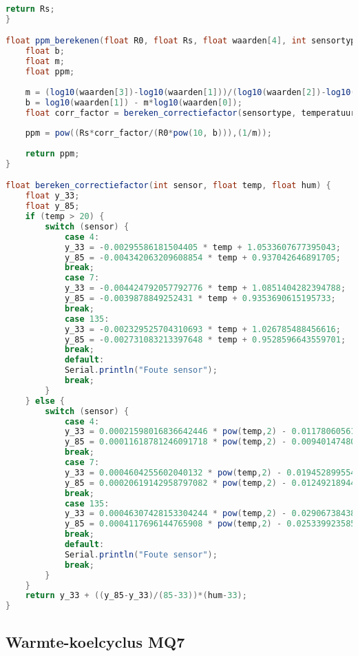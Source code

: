 \begin{lstlisting}[language=Java,caption={MQ sensoren naar de databank}]
    return Rs;
}

float ppm_berekenen(float R0, float Rs, float waarden[4], int sensortype, float temperatuur, float vochtigheid) {
    float b;
    float m;
    float ppm;
    
    m = (log10(waarden[3])-log10(waarden[1]))/(log10(waarden[2])-log10(waarden[0]));
    b = log10(waarden[1]) - m*log10(waarden[0]);
    float corr_factor = bereken_correctiefactor(sensortype, temperatuur, vochtigheid);
    
    ppm = pow((Rs*corr_factor/(R0*pow(10, b))),(1/m));
    
    return ppm;
}

float bereken_correctiefactor(int sensor, float temp, float hum) {
    float y_33;
    float y_85;
    if (temp > 20) {
        switch (sensor) {
            case 4:
            y_33 = -0.00295586181504405 * temp + 1.0533607677395043;
            y_85 = -0.004342063209608854 * temp + 0.937042646891705;
            break;
            case 7:
            y_33 = -0.004424792057792776 * temp + 1.0851404282394788;
            y_85 = -0.0039878849252431 * temp + 0.9353690615195733;
            break;
            case 135:
            y_33 = -0.002329525704310693 * temp + 1.026785488456616;
            y_85 = -0.002731083213397648 * temp + 0.9528596643559701;
            break;
            default:
            Serial.println("Foute sensor");
            break;
        }
    } else {
        switch (sensor) {
            case 4:
            y_33 = 0.00021598016836642446 * pow(temp,2) - 0.011780605617435404 * temp + 1.1489572784939854;
            y_85 = 0.00011618781246091718 * pow(temp,2) - 0.009401474805251435 * temp + 0.9921017705779126;
            break;
            case 7:
            y_33 = 0.0004604255602040132 * pow(temp,2) - 0.019452899554979888 * temp + 1.2135189729083746;
            y_85 = 0.00020619142958797082 * pow(temp,2) - 0.01249218944803551 * temp + 1.0274335776434782;
            break;
            case 135:
            y_33 = 0.00046307428153304244 * pow(temp,2) - 0.02906738438091286 * temp + 1.3784941304658396;
            y_85 = 0.0004117696144765908 * pow(temp,2) - 0.025339923585248027 * temp + 1.245958990497358;
            break;
            default:
            Serial.println("Foute sensor");
            break;
        }
    }
    return y_33 + ((y_85-y_33)/(85-33))*(hum-33);
}

\end{lstlisting}


\subsection{Warmte-koelcyclus MQ7}
\label{subsec:script_mq7}

